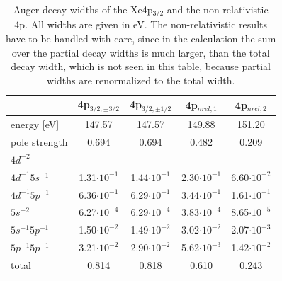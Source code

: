 \begin{table}[h]
 \centering
 \caption{Auger decay widths of the Xe4p$_{3/2}$ and the non-relativistic
          4p. All widths are given in \unit{eV}. The non-relativistic
          results have to be handled with care, since in the calculation
          the sum over the partial decay widths is much larger, than the
          total decay width, which is not seen in this table, because
          partial widths are renormalized to the total width.}
 \begin{tabular}{lcccc}
   \toprule
                      & 4p$_{3/2,\pm 3/2}$ & 4p$_{3/2,\pm 1/2}$ & 4p$_{nrel,1}$  & 4p$_{nrel,2}$ \\
   \midrule                                                                                     
   energy [\unit{eV}] &   147.57           &    147.57          &  149.88        &   151.20    \\
   pole strength       &     0.694          &      0.694         &    0.482       &     0.209   \\
   \midrule                                                                                    
   $4d^{-2}$          &      --            &        --          &       --       &     --        \\
   $4d^{-1}5s^{-1}$   & 1.31$\cdot10^{-1}$ & 1.44$\cdot10^{-1}$ & 2.30$\cdot10^{-1}$ & 6.60$\cdot10^{-2}$\\
   $4d^{-1}5p^{-1}$   & 6.36$\cdot10^{-1}$ & 6.29$\cdot10^{-1}$ & 3.44$\cdot10^{-1}$ & 1.61$\cdot10^{-1}$\\
   $5s^{-2}$          & 6.27$\cdot10^{-4}$ & 6.29$\cdot10^{-4}$ & 3.83$\cdot10^{-4}$ & 8.65$\cdot10^{-5}$\\
   $5s^{-1}5p^{-1}$   & 1.50$\cdot10^{-2}$ & 1.49$\cdot10^{-2}$ & 3.02$\cdot10^{-2}$ & 2.07$\cdot10^{-3}$\\
   $5p^{-1}5p^{-1}$   & 3.21$\cdot10^{-2}$ & 2.90$\cdot10^{-2}$ & 5.62$\cdot10^{-3}$ & 1.42$\cdot10^{-2}$\\
   \midrule
   total              &   0.814            &   0.818            &  0.610         &   0.243     \\
   \bottomrule
 \end{tabular}
 \label{table:xe_auger_rest}
\end{table}


